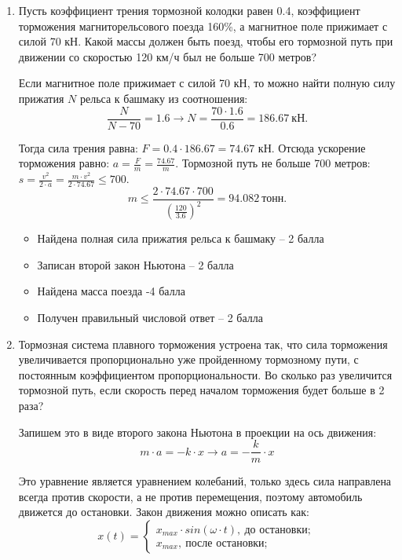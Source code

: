 \begin{enumerate}
    \item Пусть коэффициент трения тормозной колодки равен 0.4, коэффициент торможения магниторельсового поезда 160\%, а магнитное поле прижимает с силой 70 кН. Какой массы должен быть поезд, чтобы его тормозной путь при движении со скоростью 120 км/ч был не больше 700 метров?
    
    Если магнитное поле прижимает с силой 70 кН, то можно найти полную силу прижатия $N$ рельса к башмаку из соотношения: $$\frac{N}{N-70}=1.6 \rightarrow N=\frac{70 \cdot 1.6}{0.6}= 186.67 \: \text{кН}.$$
    
    Тогда сила трения равна: $F=0.4 \cdot 186.67=74.67$ кН. Отсюда ускорение торможения равно: $a=\frac{F}{m}=\frac{74.67}{m}$.  Тормозной путь не больше 700 метров: $s=\frac{v^2}{2 \cdot a}=\frac{m \cdot v^2}{2 \cdot 74.67} \leq 700$.
    $$m \leq \frac{2 \cdot 74.67 \cdot 700}{\left(\frac{120}{3.6}\right)^2} =94.082 \: \text{тонн}.$$


    \markSection

    \begin{itemize}
	    \item Найдена полная сила прижатия рельса к башмаку – 2 балла
	    \item Записан второй закон Ньютона – 2 балла
	    \item Найдена масса поезда -4 балла
	    \item Получен правильный числовой ответ – 2 балла
    \end{itemize}

    \item Тормозная система плавного торможения устроена так, что сила торможения увеличивается пропорционально уже пройденному тормозному пути, с постоянным коэффициентом пропорциональности. Во сколько раз увеличится тормозной путь, если скорость перед началом торможения будет больше в 2 раза?
    
    Запишем это в виде второго закона Ньютона в проекции на ось движения:
    $$m \cdot a=-k \cdot x \rightarrow a= -\frac{k}{m} \cdot x$$

    Это уравнение является уравнением колебаний, только здесь сила направлена всегда против скорости, а не против перемещения, поэтому автомобиль движется до остановки. 
    Закон движения можно описать как:
    $$ x(t)=\left\{
        \begin{aligned}
            x_{max} \cdot sin(\omega \cdot t), \: \text{до остановки};\\
            x_{max}, \: \text{после остановки};
        \end{aligned}
    \right. $$


\end{enumerate}
